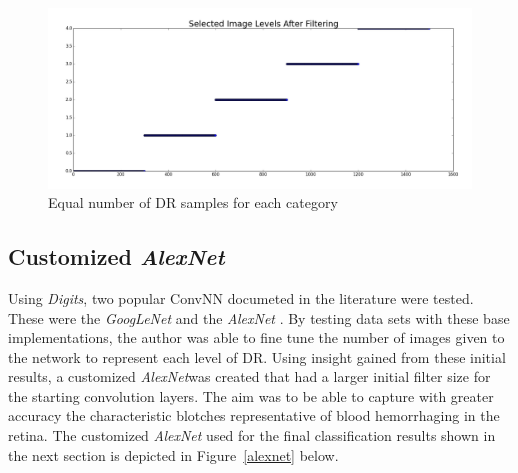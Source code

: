 \documentclass[letterpaper,12pt]{article}
\newcommand{\figref}[1]{Figure~\ref{#1}}
\begin{document}
\begin{figure}[htbp]
\begin{center}
\includegraphics[scale=0.25]{images/After_filtering.png}
\caption{Equal number of DR samples for each category}
\label{filtered}
\end{center}
\end{figure}

\subsection{Customized \textit{AlexNet}}

Using \textit{Digits}, two popular ConvNN documeted in the literature were tested. These were the \textit{GoogLeNet} \cite{GoogLeNet} and the \textit{AlexNet} \cite{AlexNet}. By testing data sets with these base implementations, the author was able to fine tune the number of images given to the network to represent each level of DR. Using insight gained from these initial results, a customized \textit{AlexNet}was created that had a larger initial filter size for the starting convolution layers. The aim was to be able to capture with greater accuracy the characteristic blotches representative of blood hemorrhaging in the retina. The customized \textit{AlexNet} used for the final classification results shown in the next section is depicted in \figref{alexnet} below.
\end{document}
